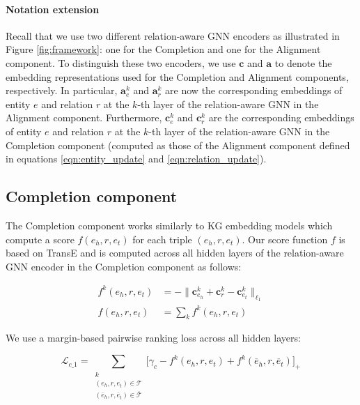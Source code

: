\documentclass[11pt]{article}
\begin{document}
\paragraph{Notation extension} Recall that we use two different relation-aware GNN encoders as illustrated in Figure \ref{fig:framework}: one for the Completion and one for the Alignment component. To distinguish these two encoders, we use  $\mathbf{c}$ and $\mathbf{a}$ to denote the embedding representations used for the Completion and Alignment components, respectively. In particular, $\mathbf{a}_e^{k}$ and $\mathbf{a}_r^{k}$ are now the corresponding embeddings of entity $e$ and relation $r$ at the $k$-th layer of the relation-aware GNN in the Alignment component. Furthermore, $\mathbf{c}_e^{k}$ and $\mathbf{c}_r^{k}$ are the corresponding embeddings of entity $e$ and relation $r$ at the $k$-th layer of the relation-aware GNN in the Completion component (computed as those of the Alignment component defined in equations \ref{eqn:entity_update} and \ref{eqn:relation_update}). 

\subsection{Completion component}\label{ssec:completion}

The Completion component  works similarly to KG embedding models \cite{Nguyen2020KGC,Ji_2021} which compute a score $f(e_h, r, e_t)$ for each triple $(e_h, r, e_t)$. Our score function $f$ is based on  TransE \cite{bordes2013translating} and is computed across all hidden layers of the relation-aware GNN encoder in the Completion component as follows:

\begin{align}
f^k(e_h, r, e_t) &= -\|\mathbf{c}^k_{e_h} + \mathbf{c}^k_r - \mathbf{c}^k_{e_t}\|_{\ell_{1}} \\
 f(e_h, r, e_t) &= \sum_k f^k(e_h, r, e_t) \label{equa:scorefunction}
\end{align}

We use a margin-based pairwise ranking loss \cite{bordes2013translating} across all hidden layers:

{\small
\begin{equation}
\mathcal{L}_{c\_1} = \sum_{ \substack{k \\ (e_h, r, e_t) \in \mathcal{T} \\ (\overline{e}_h, r,  \overline{e}_t) \in \overline{\mathcal{T}}}} {[\gamma_c - f^k(e_h, r, e_t)} +
    f^k(\overline{e}_h, r,  \overline{e}_t)]_+ 
    \label{eqn:complossterm1}
\end{equation}
}
\end{document}

